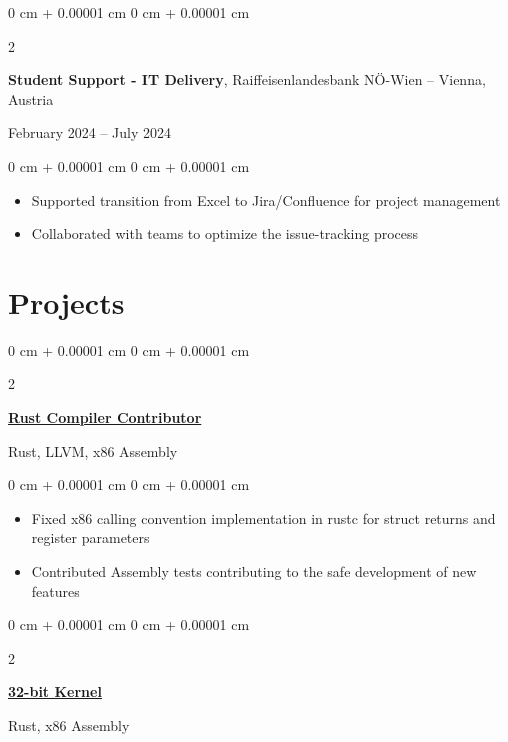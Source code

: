 \documentclass[10pt, letterpaper]{article}
\newenvironment{highlights}{
    \begin{itemize}[
        topsep=0.10 cm,
        parsep=0.10 cm,
        partopsep=0pt,
        itemsep=0pt,
        leftmargin=0 cm + 10pt
    ]
}{
    \end{itemize}
}
\newenvironment{onecolentry}{
    \begin{adjustwidth}{
        0 cm + 0.00001 cm
    }{
        0 cm + 0.00001 cm
    }
}{
    \end{adjustwidth}
}
\newenvironment{twocolentry}[2][]{
    \onecolentry
    \def\secondColumn{#2}
    \setcolumnwidth{\fill, 4.5 cm}
    \begin{paracol}{2}
}{
    \switchcolumn \raggedleft \secondColumn
    \end{paracol}
    \endonecolentry
}
\begin{document}
    \vspace{0.15 cm}

    \begin{twocolentry}
        {February 2024 – July 2024}
        \textbf{Student Support - IT Delivery}, Raiffeisenlandesbank NÖ-Wien -- Vienna, Austria
    \end{twocolentry}

    \vspace{0.05 cm}

    \begin{onecolentry}
        \begin{highlights}
            \item Supported transition from Excel to Jira/Confluence for project management
            \item Collaborated with teams to optimize the issue-tracking process
        \end{highlights}
    \end{onecolentry}

    \section{Projects}

    \begin{twocolentry}
        {Rust, LLVM, x86 Assembly}
        \href{https://github.com/rust-lang/rust/}{\textbf{Rust Compiler Contributor}}
    \end{twocolentry}

    \vspace{0.05 cm}
    
    \begin{onecolentry}
        \begin{highlights}
            \item Fixed x86 calling convention implementation in rustc for struct returns and register parameters
            \item Contributed Assembly tests contributing to the safe development of new features
        \end{highlights}
    \end{onecolentry}

    \vspace{0.1 cm}


    \begin{twocolentry}
        {Rust, x86 Assembly}
        \href{https://github.com/kentucky-fried-kernel/kfs}{\textbf{32-bit Kernel}}
    \end{twocolentry}
\end{document}
